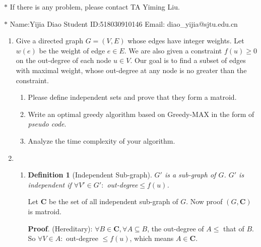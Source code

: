 \documentclass[12pt,a4paper]{article}
\makeatletter
\newtheorem*{solution}{Solution}
\newtheorem{definition}{Definition}
\theoremstyle{definition}
\renewenvironment{solution}[1][Solution] {\par\pushQED{\qed}\normalfont\topsep6\p@\@plus6\p@\relax\trivlist\item[\hskip\labelsep\bfseries#1\@addpunct{.}]\ignorespaces}{\popQED\endtrivlist\@endpefalse} \makeatother
\makeatother
\begin{document}
\noindent

\noindent{}
\begin{center}
\footnotesize{\color{red}$*$ If there is any problem, please contact TA Yiming Liu.}

\footnotesize{\color{blue}$*$ Name:Yijia Diao \quad Student ID:518030910146 \quad Email: diao\_yijia@sjtu.edu.cn}
\end{center}

\begin{enumerate}
\item Give a directed graph $G=(V,E)$ whose edges have integer weights. Let $w(e)$ be the weight of edge $e\in E$. We are also given a constraint $f(u)\geq 0$ on the out-degree of each node $u\in V$. Our goal is to find a subset of edges with maximal weight, whose out-degree at any node is no greater than the constraint.
	\begin{enumerate}
	    \item Please define independent sets and prove that they form a matroid.
	    \item Write an optimal greedy algorithm based on Greedy-MAX in the form of \emph{pseudo code}.
	    \item Analyze the time complexity of your algorithm.
	\end{enumerate}

	\begin{solution}
		\begin{enumerate}
			\item
			\begin{definition}[Independent Sub-graph]
				$ G' $ is a sub-graph of $ G $. $ G' $ is independent if $ \forall V'\in G':$ out-degree$\leq f(u) $.
			\end{definition}
			Let $ \mathbf{C} $ be the set of all independent sub-graph of $ G $. Now proof $ (G,\mathbf{C}) $ is matroid.
			
			\textbf{Proof}. (Hereditary): $ \forall B\in\mathbf{C},\forall A\subseteq B $, the out-degree of $A \leq $ that of $ B $. So $ \forall V\in A:$ out-degree $\leq f(u) $, which means $ A\in\mathbf{C} $.
			

\end{enumerate}
\end{solution}
\end{enumerate}
\end{document}
